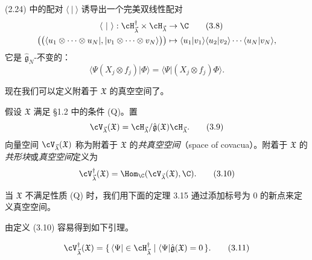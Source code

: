 (2.24) 中的配对 $\langle\ |\ \rangle$ 诱导出一个完美双线性配对
\begin{align}
\langle\ |\ \rangle:\cH^{\dagger}_{\vec{\lambda}}\times\cH_{\vec{\lambda}}&\to\C \tag{3.8}\\
\big(\big(\langle u_1\otimes\cdots\otimes u_N|,|v_1\otimes\cdots\otimes v_N\rangle\big)\big)
&\mapsto\langle u_1|v_1\rangle\langle u_2|v_2\rangle\cdots\langle u_N|v_N\rangle, \nonumber
\end{align}
它是 $\hat{\mathfrak{g}}_N$-不变的：
\[
\langle\Psi(X_j\otimes f_j)|\Phi\rangle=\langle\Psi|(X_j\otimes f_j)\Phi\rangle.
\]



现在我们可以定义附着于 $\mathfrak{X}$ 的真空空间了。

\begin{definition}[3.3]
假设 $\mathfrak{X}$ 满足 §1.2 中的条件 (Q)。置
\begin{equation}
\cV_{\vec{\lambda}}(\mathfrak{X})=\cH_{\vec{\lambda}}/\hat{\mathfrak{g}}(\mathfrak{X})\cH_{\vec{\lambda}}. \tag{3.9}
\end{equation}
向量空间 $\cV_{\vec{\lambda}}(\mathfrak{X})$ 称为附着于 $\mathfrak{X}$ 的\emph{共真空空间}（space of covacua）。附着于 $\mathfrak{X}$ 的\emph{共形块}或\emph{真空空间}定义为
\begin{equation}
\cV^{\dagger}_{\vec{\lambda}}(\mathfrak{X})=\Hom_{\C}(\cV_{\vec{\lambda}}(\mathfrak{X}),\C). \tag{3.10}
\end{equation}
\end{definition}


当 $\mathfrak{X}$ 不满足性质 (Q) 时，我们用下面的定理 3.15 通过添加标号为 0 的新点来定义真空空间。

由定义 (3.10) 容易得到如下引理。

\begin{lemma}[3.4]
\begin{equation}
\cV^{\dagger}_{\vec{\lambda}}(\mathfrak{X})
=\{\,\langle\Psi|\in\cH^{\dagger}_{\vec{\lambda}}\mid\langle\Psi|\hat{\mathfrak{g}}(\mathfrak{X})=0\,\}. \tag{3.11}
\end{equation}
\end{lemma}

